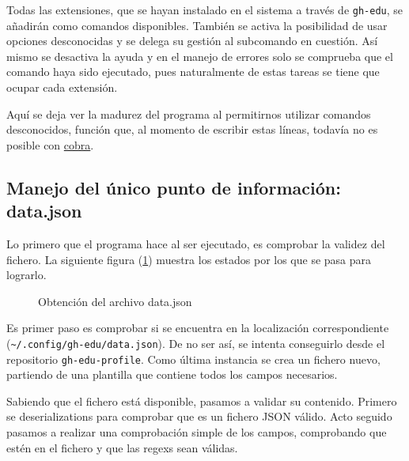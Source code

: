Todas las extensiones, que se hayan instalado en el sistema a través de \verb|gh-edu|, se añadirán como comandos disponibles. También se activa la posibilidad de usar opciones desconocidas y se delega su gestión al subcomando en cuestión. Así mismo se desactiva la ayuda y en el manejo de errores solo se comprueba que el comando haya sido ejecutado, pues naturalmente de estas tareas se tiene que ocupar cada extensión.

Aquí se deja ver la madurez del programa al permitirnos utilizar comandos desconocidos, función que, al momento de escribir estas líneas, todavía no es posible con \href{https://github.com/spf13/cobra/issues/739}{cobra}.

\subsection{Manejo del único punto de información: data.json} \label{impl:data.json}
Lo primero que el programa hace al ser ejecutado, es comprobar la validez del fichero. La siguiente figura (\ref{fig:dataGraph}) muestra los estados por los que se pasa para lograrlo.

\begin{figure}[H]
    \centering
    \caption{Obtención del archivo data.json}
    \label{fig:dataGraph}
\end{figure}

Es primer paso es comprobar si se encuentra en la localización correspondiente (\verb|~/.config/gh-edu/data.json|). De no ser así, se intenta conseguirlo desde el repositorio \verb|gh-edu-profile|. Como última instancia se crea un fichero nuevo, partiendo de una plantilla que contiene todos los campos necesarios.

Sabiendo que el fichero está disponible, pasamos a validar su contenido. Primero se \glspl{deserialization} para comprobar que es un fichero JSON válido. Acto seguido pasamos a realizar una comprobación simple de los campos, comprobando que estén en el fichero y que las \glspl{regex} sean válidas.

